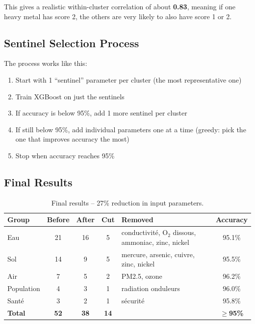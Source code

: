 \documentclass[12pt,a4paper]{article}
\begin{document}
This gives a realistic within-cluster correlation of about \textbf{0.83}, meaning if one heavy metal has score 2, the others are very likely to also have score 1 or 2.

\subsection{Sentinel Selection Process}

The process works like this:

\begin{enumerate}
    \item Start with 1 ``sentinel'' parameter per cluster (the most representative one)
    \item Train XGBoost on just the sentinels
    \item If accuracy is below 95\%, add 1 more sentinel per cluster
    \item If still below 95\%, add individual parameters one at a time (greedy: pick the one that improves accuracy the most)
    \item Stop when accuracy reaches 95\%
\end{enumerate}

\subsection{Final Results}

\begin{table}[H]
\centering
\begin{tabular}{lcccp{4cm}c}
\toprule
\textbf{Group} & \textbf{Before} & \textbf{After} & \textbf{Cut} & \textbf{Removed} & \textbf{Accuracy} \\
\midrule
Eau & 21 & 16 & 5 & conductivit\'e, O$_2$ dissous, ammoniac, zinc, nickel & 95.1\% \\
Sol & 14 & 9 & 5 & mercure, arsenic, cuivre, zinc, nickel & 95.5\% \\
Air & 7 & 5 & 2 & PM2.5, ozone & 96.2\% \\
Population & 4 & 3 & 1 & radiation onduleurs & 96.0\% \\
Sant\'e & 3 & 2 & 1 & s\'ecurit\'e & 95.8\% \\
\midrule
\textbf{Total} & \textbf{52} & \textbf{38} & \textbf{14} & & $\geq$\textbf{95\%} \\
\bottomrule
\end{tabular}
\caption{Final results -- 27\% reduction in input parameters.}
\end{table}
\end{document}
